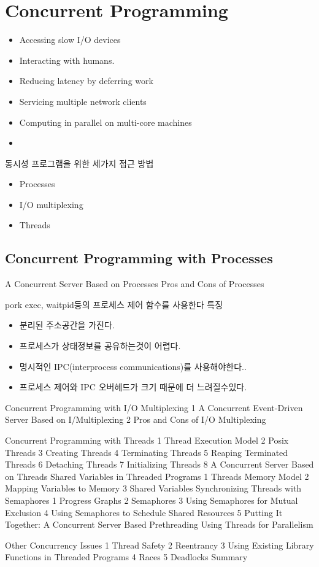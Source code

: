 
\chapter{Concurrent Programming}

\begin{itemize}
    \item Accessing slow I/O devices
    \item Interacting with humans.
    \item Reducing latency by deferring work
    \item Servicing multiple network clients
    \item Computing in parallel on multi-core machines
    \item 
\end{itemize}

동시성 프로그램을 위한 세가지 접근 방법
\begin{itemize}
    \item Processes
    \item I/O multiplexing
    \item Threads
\end{itemize}



\section{Concurrent Programming with Processes}
A Concurrent Server Based on Processes
Pros and Cons of Processes

pork exec, waitpid등의 프로세스 제어 함수를 사용한다
특징
\begin{itemize}
    \item 분리된 주소공간을 가진다.
    \item 프로세스가 상태정보를 공유하는것이 어렵다.
    \item 명시적인 IPC(interprocess communications)를 사용해야한다..
    \item 프로세스 제어와 IPC 오버헤드가 크기 때문에 더 느려질수있다.
\end{itemize}


Concurrent Programming with I/O Multiplexing
1 A Concurrent Event-Driven Server Based on I/Multiplexing
2 Pros and Cons of I/O Multiplexing




Concurrent Programming with Threads
1 Thread Execution Model
2 Posix Threads
3 Creating Threads
4 Terminating Threads
5 Reaping Terminated Threads
6 Detaching Threads
7 Initializing Threads
8 A Concurrent Server Based on Threads
Shared Variables in Threaded Programs
1 Threads Memory Model
2 Mapping Variables to Memory
3 Shared Variables
Synchronizing Threads with Semaphores
1 Progress Graphs
2 Semaphores
3 Using Semaphores for Mutual Exclusion
4 Using Semaphores to Schedule Shared Resources
5 Putting It Together: A Concurrent Server Based Prethreading
Using Threads for Parallelism




Other Concurrency Issues
1 Thread Safety
2 Reentrancy
3 Using Existing Library Functions in Threaded Programs
4 Races
5 Deadlocks
Summary
